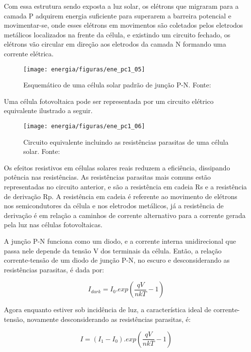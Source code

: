 	Com essa estrutura sendo exposta a luz solar, os elétrons que migraram para a camada P adquirem energia suficiente para superarem a barreira potencial e movimentar-se, onde esses elétrons em movimentos são coletados pelos eletrodos metálicos localizados na frente da célula, e existindo um circuito fechado, os elétrons vão circular em direção aos eletrodos da camada N formando uma corrente elétrica. \cite{Villalva}

	
\begin{figure}[H]
		\centering
		\texttt{[image: energia/figuras/ene\_pc1\_05]}
		\caption{Esquemático de uma célula solar padrão de junção P-N. Fonte: \cite{Bluesol}}
		\label{ene_pc1_05}
	\end{figure}	


	Uma célula fotovoltaica pode ser representada por um circuito elétrico equivalente ilustrado a seguir.
	
	
\begin{figure}[H]
		\centering
		\texttt{[image: energia/figuras/ene\_pc1\_06]}
		\caption{Circuito equivalente incluindo as resistências parasitas de uma célula solar. Fonte: \cite{Hecktheuer}}
		\label{ene_pc1_06}
	\end{figure}

		Os efeitos resistivos em células solares reais reduzem a eficiência, dissipando potência nas resistências. As resistências parasitas mais comuns estão representadas no circuito anterior, e são a resistência em cadeia Rs e a resistência de derivação Rp. A resistência em cadeia é referente ao movimento de elétrons nos semicondutores da célula e nos eletrodos metálicos, já a resistência de derivação é em relação a caminhos de corrente alternativo para a corrente gerada pela luz nas células fotovoltaicas. \cite{Campesato}
	
	A junção P-N funciona como um diodo, e a corrente interna unidirecional que passa nele depende da tensão V dos terminais da célula. Então, a relação corrente-tensão de um diodo de junção P-N, no escuro e desconsiderando as resistências parasitas, é dada por:
	
	\begin{equation}
	I_{dark} = I_0 . exp(\dfrac{qV}{nkT} - 1)
	\end{equation}
	
	Agora enquanto estiver sob incidência de luz, a característica ideal de corrente-tensão, novamente desconsiderando as resistências parasitas, é:
	
	\begin{equation}
	I = (I_1 - I_0) . exp(\dfrac{qV}{nkT} - 1)
	\end{equation}
	
